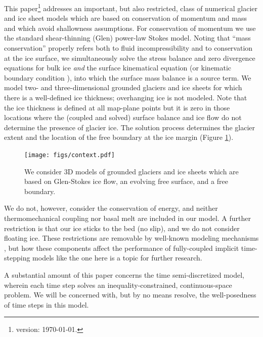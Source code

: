 \documentclass[letterpaper,final,12pt,reqno]{amsart}
\begin{document}
This paper\footnote{version: \today.} addresses an important, but also restricted, class of numerical glacier and ice sheet models which are based on conservation of momentum and mass and which avoid shallowness assumptions.  For conservation of momentum we use the standard shear-thinning (Glen) power-law Stokes model.  Noting that ``mass conservation'' properly refers both to fluid incompressibility and to conservation at the ice surface, we simultaneously solve the stress balance and zero divergence equations for bulk ice \emph{and} the surface kinematical equation (or kinematic boundary condition \cite{GreveBlatter2009}), into which the surface mass balance is a source term.  We model two- and three-dimensional grounded glaciers and ice sheets for which there is a well-defined ice thickness; overhanging ice is not modeled.  Note that the ice thickness is defined at all map-plane points but it is zero in those locations where the (coupled and solved) surface balance and ice flow do not determine the presence of glacier ice.  The solution process determines the glacier extent and the location of the free boundary at the ice margin \cite{SchoofHewitt2013} (Figure \ref{fig:context}).

\begin{figure}[ht]
\begin{center}
\texttt{[image: figs/context.pdf]}
\end{center}
\caption{We consider 3D models of grounded glaciers and ice sheets which are based on Glen-Stokes ice flow, an evolving free surface, and a free boundary.}
\label{fig:context}
\end{figure}

We do not, however, consider the conservation of energy, and neither thermomechanical coupling nor basal melt are included in our model.  A further restriction is that our ice sticks to the bed (no slip), and we do not consider floating ice.  These restrictions are removable by well-known modeling mechanisms \cite[for example]{Aschwandenetal2012,Winkelmannetal2011}, but how these components affect the performance of fully-coupled implicit time-stepping models like the one here is a topic for further research.

A substantial amount of this paper concerns the time semi-discretized model, wherein each time step solves an inequality-constrained, continuous-space problem.  We will be concerned with, but by no means resolve, the well-posedness of time steps in this model.
\end{document}
